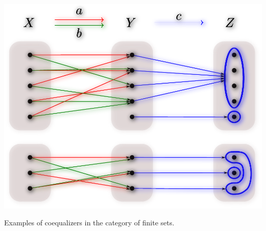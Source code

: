 \begin{frame}
\centering\includegraphics[width=0.8\framewidth]{fig/coequalizer.pdf}

\begin{block}{}
\centering Examples of coequalizers in the category of finite sets.
\end{block}
\end{frame}